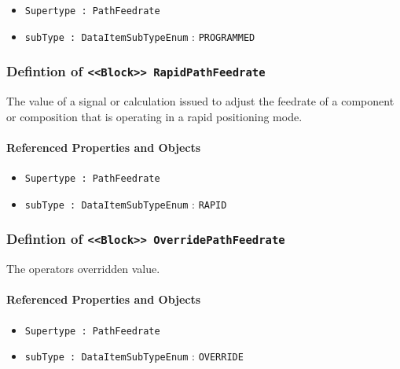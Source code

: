 \begin{itemize}
\item \texttt{Supertype : PathFeedrate}

\item \texttt{subType : DataItemSubTypeEnum} : \texttt{PROGRAMMED}

\end{itemize}
\FloatBarrier
\subsubsection{Defintion of \texttt{<<Block>> RapidPathFeedrate}}
  \label{type:RapidPathFeedrate}

\FloatBarrier

The value of a signal or calculation issued to adjust the feedrate of a component or composition that is operating in a rapid positioning mode.

\FloatBarrier
\paragraph{Referenced Properties and Objects}

\begin{itemize}
\item \texttt{Supertype : PathFeedrate}

\item \texttt{subType : DataItemSubTypeEnum} : \texttt{RAPID}

\end{itemize}
\FloatBarrier
\subsubsection{Defintion of \texttt{<<Block>> OverridePathFeedrate}}
  \label{type:OverridePathFeedrate}

\FloatBarrier

The operators overridden value.

\FloatBarrier
\paragraph{Referenced Properties and Objects}

\begin{itemize}
\item \texttt{Supertype : PathFeedrate}

\item \texttt{subType : DataItemSubTypeEnum} : \texttt{OVERRIDE}

\end{itemize}
\FloatBarrier
